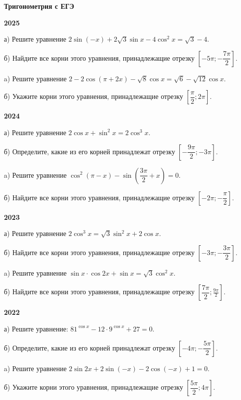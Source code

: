 \centerline{\bf \Huge Тригонометрия с ЕГЭ}


\centerline{\bf \Huge 2025}

 а) Решите уравнение $2 \sin (-x)+2 \sqrt{3} \sin x-4 \cos ^2 x=\sqrt{3}-4$.

б) Найдите все корни этого уравнения, принадлежащие отрезку $\left[-5 \pi ;-\dfrac{7 \pi}{2}\right]$.

 a) Решите уравнение $2-2 \cos (\pi+2 x)-\sqrt{8} \cos x=\sqrt{6}-\sqrt{12} \cos x$.

б) Укажите корни этого уравнения, принадлежащие отрезку $\left[\dfrac{\pi}{2} ; 2 \pi\right]$.

\centerline{\bf \Huge 2024}

 а) Решите уравнение $2 \cos x+\sin ^2 x=2 \cos ^3 x$.

б) Определите, какие из его корней принадлежат отрезку $\left[-\dfrac{9 \pi}{2} ;-3 \pi\right]$.

 a) Решите уравнение $\cos ^2(\pi-x)-\sin \left(\dfrac{3 \pi}{2}+x\right)=0$.

б) Найдите все корни этого уравнения, принадлежащие отрезку $\left[-2 \pi ;-\dfrac{\pi}{2}\right]$.

\centerline{\bf \Huge 2023}

 а) Решите уравнение $2 \cos ^3 x=\sqrt{3} \sin ^2 x+2 \cos x$.

б) Найдите все корни этого уравнения, принадлежащие отрезку $\left[-3 \pi ;-\dfrac{3 \pi}{2}\right]$.

 a) Решите уравнение $\sin x \cdot \cos 2 x+\sin x=\sqrt{3} \cos ^2 x$.

б) Найдите все корни этого уравнения, принадлежащие отрезку $\left[\dfrac{7 \pi}{2} ; \frac{9 \pi}{2}\right]$.

\centerline{\bf \Huge 2022}

 а) Решите уравнение: $81^{\cos x}-12 \cdot 9^{\cos x}+27=0$.

б) Определите, какие из его корней принадлежат отрезку $\left[-4 \pi ;-\dfrac{5 \pi}{2}\right]$.

 a) Решите уравнение $2 \sin 2 x+2 \sin (-x)-2 \cos (-x)+1=0$.

б) Укажите корни этого уравнения, принадлежащие отрезку $\left[\dfrac{5 \pi}{2} ; 4 \pi\right]$.



